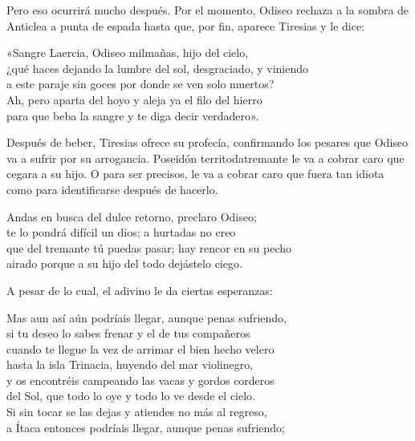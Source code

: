 Pero eso ocurrirá mucho después. Por el momento, Odiseo rechaza a la sombra de Anticlea a punta de espada
hasta que, por fin, aparece Tiresias y le dice:

\begin{versocita}
«Sangre Laercia, Odiseo milmañas, hijo del cielo,\\
¿qué haces dejando la lumbre del sol, desgraciado, y viniendo\\
a este paraje sin goces por donde se ven solo muertos?\\
Ah, pero aparta del hoyo y aleja ya el filo del hierro\\
para que beba la sangre y te diga decir verdadero».
\end{versocita}

Después de beber, Tiresias ofrece su profecía, confirmando los pesares que Odiseo va a sufrir por su arrogancia. Poseidón territodatremante le va a cobrar caro que cegara a su hijo. O para ser precisos, le va a cobrar caro que fuera tan idiota como para identificarse después de hacerlo.

\begin{versocita}
Andas en busca del dulce retorno, preclaro Odiseo;\\
te lo pondrá difícil un dios; a hurtadas no creo\\
que del tremante tú puedas pasar; hay rencor en su pecho\\
airado porque a su hijo del todo dejástelo ciego.
\end{versocita}

A pesar de lo cual, el adivino le da ciertas esperanzas:

\begin{versocita}
Mas aun así aún podríais llegar, aunque penas sufriendo,\\
si tu deseo lo sabes frenar y el de tus compañeros\\
cuando te llegue la vez de arrimar el bien hecho velero\\
hasta la isla Trinacia, huyendo del mar violinegro,\\
y os encontréis campeando las vacas y gordos corderos\\
del Sol, que todo lo oye y todo lo ve desde el cielo.\\
Si sin tocar se las dejas y atiendes no más al regreso,\\
a Ítaca entonces podríais llegar, aunque penas sufriendo;
\end{versocita}

